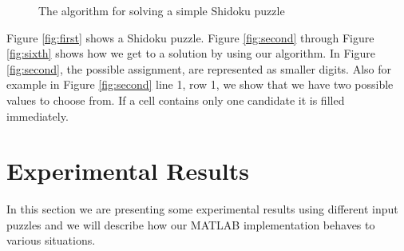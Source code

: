 \documentclass[12pt,a4paper]{article} %
\begin{document}
\begin{figure}[ht!]
\begin{center}
%
\end{center}
\caption{%
The algorithm for solving a simple Shidoku puzzle 
}%
\end{figure}
Figure \ref{fig:first} shows a Shidoku puzzle. Figure \ref{fig:second} through Figure \ref{fig:sixth} shows how we get to a solution by using our algorithm. In Figure \ref{fig:second}, the possible assignment, are represented as smaller digits. Also for example in Figure \ref{fig:second} line 1, row 1, we show that we have two possible values to choose from. If a cell contains only one candidate it is filled immediately.
\newline
\section{Experimental Results}
In this section we are presenting some experimental results using different input puzzles and we will describe how our MATLAB implementation behaves to various situations.
\end{document}
